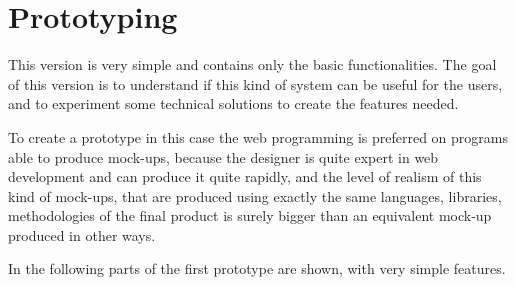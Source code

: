 \section{Prototyping}

This version is very simple and contains only the basic functionalities. 
The goal of this version is to understand if this kind of system can be useful for the users, and to experiment some technical solutions to create the features needed. 

To create a prototype in this case the web programming is preferred on programs able to produce mock-ups, because the designer is quite expert in web development and can produce it quite rapidly, and the level of realism of this kind of mock-ups, that are produced using exactly the same languages, libraries, methodologies of the final product is surely bigger than an equivalent mock-up produced in other ways. 


In the following parts of the first prototype are shown, with very simple features.

